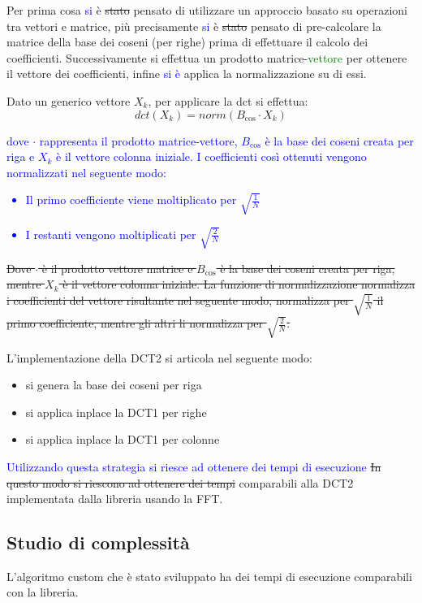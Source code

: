 Per prima cosa \textcolor{blue}{si} è \st{stato} pensato di utilizzare un approccio basato su operazioni
tra vettori e matrice, più precisamente \textcolor{blue}{si} è \st{stato} pensato di pre-calcolare la matrice
della base dei coseni (per righe) prima di effettuare il calcolo dei coefficienti.
Successivamente si effettua un prodotto matrice-\textcolor{green}{vettore} per ottenere il vettore
dei coefficienti, infine \textcolor{blue}{si è} applica la normalizzazione su di essi.

Dato un generico vettore $X_k$, per applicare la dct si effettua:
\begin{equation*}
    dct(X_k) = norm(B_{\cos}\cdot X_k )
\end{equation*}
\textcolor{blue}{dove $\cdot$ rappresenta il prodotto matrice-vettore, $B_{\cos}$
    è la base dei coseni creata per riga e $X_k$ è il vettore colonna iniziale.
    I coefficienti così ottenuti vengono normalizzati nel seguente modo:
    \begin{itemize}
        \item Il primo coefficiente viene moltiplicato per $\sqrt{\frac{1}{N}}$
        \item I restanti vengono moltiplicati per $\sqrt{\frac{2}{N}}$
    \end{itemize}
}

\st{Dove $\cdot$ è il prodotto vettore matrice e $B_{\cos}$ è la base dei coseni creata
    per riga, mentre $X_k$ è il vettore colonna iniziale. La funzione di normalizzazione
    normalizza i coefficienti del vettore risultante nel seguente modo, normalizza
    per $\sqrt{\frac{1}{N}}$ il primo coefficiente, mentre gli altri li normalizza
    per $\sqrt{\frac{2}{N}}$.
}%

L'implementazione della DCT2 si articola nel seguente modo:
\begin{itemize}
    \item si genera la base dei coseni per riga
    \item si applica inplace la DCT1 per righe
    \item si applica inplace la DCT1 per colonne
\end{itemize}
\textcolor{blue}{Utilizzando questa strategia si riesce ad ottenere dei tempi di esecuzione}
\st{In questo modo si riescono ad ottenere dei tempi} comparabili alla DCT2 implementata
dalla libreria usando la FFT.

\subsection{Studio di complessità}
L'algoritmo custom che è stato sviluppato ha dei tempi di esecuzione comparabili
con la libreria.

